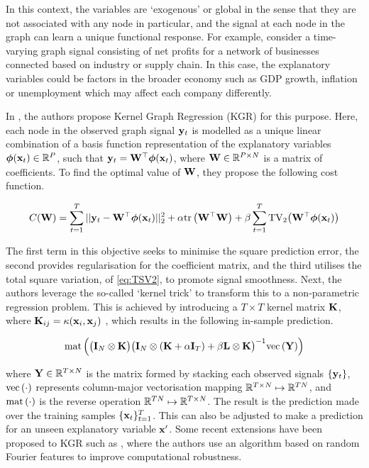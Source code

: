 In this context, the variables are `exogenous' or global in the sense that they are not associated with any node in particular, and the signal at each node in the graph can learn a unique functional response. For example, consider a time-varying graph signal consisting of net profits for a network of businesses connected based on industry or supply chain. In this case, the explanatory variables could be factors in the broader economy such as GDP growth, inflation or unemployment which may affect each company differently. 

In \cite{Venkitaraman2019}, the authors propose Kernel Graph Regression (KGR) for this purpose. Here, each node in the observed graph signal $\mathbf{y}_t$ is modelled as a unique linear combination of a basis function representation of the explanatory variables $\boldsymbol{\phi}(\mathbf{x}_t) \in \mathbb{R}^P$, such that $\mathbf{y}_t = \mathbf{W}^\top \boldsymbol{\phi}(\mathbf{x}_t)$, where $\mathbf{W} \in \mathbb{R}^{P \times N}$ is a matrix of coefficients. To find the optimal value of $\mathbf{W}$, they propose the following cost function. 

\begin{equation}
    C(\mathbf{W}) = \sum_{t=1}^T ||\mathbf{y}_t - \mathbf{W}^\top \boldsymbol{\phi}(\mathbf{x}_t) ||_2^2 + \alpha \text{\textup{tr}}\left(\mathbf{W}^\top \mathbf{W}\right) + \beta \sum_{t=1}^T \text{TV}_2\big(\mathbf{W}^\top \boldsymbol{\phi}(\mathbf{x}_t)\big)
\end{equation}

The first term in this objective seeks to minimise the square prediction error, the second provides regularisation for the coefficient matrix, and the third utilises  the total square variation, of \cref{eq:TSV2}, to promote signal smoothness. Next, the authors leverage the so-called `kernel trick' to transform this to a non-parametric regression problem. This is achieved by introducing a $T \times T$ kernel matrix $\mathbf{K}$, where $\mathbf{K}_{ij} = \kappa(\mathbf{x}_i, \mathbf{x}_j)$ \citep{Rasmussen2005}, which results in the following in-sample prediction. 

\begin{equation}
    \text{\textup{mat}}\left(\big(\mathbf{I}_N \otimes \mathbf{K}\big)\big(\mathbf{I}_N \otimes (\mathbf{K} + \alpha \mathbf{I}_T) + \beta \mathbf{L} \otimes \mathbf{K} \big)^{-1} \text{\textup{vec}}\left(\mathbf{Y}\right)\right)
\end{equation}

where $\mathbf{Y} \in \mathbb{R}^{T \times N}$ is the matrix formed by stacking each observed signals $\{\mathbf{y}_t\}$, $\text{\textup{vec}}\left(\cdot\right)$ represents column-major vectorisation mapping $\mathbb{R}^{T \times N} \mapsto \mathbb{R}^{TN}$, and $\text{\textup{mat}}\left(\cdot\right)$ is the reverse operation $\mathbb{R}^{TN}\mapsto  \mathbb{R}^{T \times N}$. The result is the prediction made over the training samples $\{\mathbf{x}_t\}_{t=1}^T$. This can also be adjusted to make a prediction for an unseen explanatory variable $\mathbf{x}'$. Some recent extensions have been proposed to KGR such as \cite{Elias2022}, where the authors use an algorithm based on random Fourier features to improve computational robustness. 

